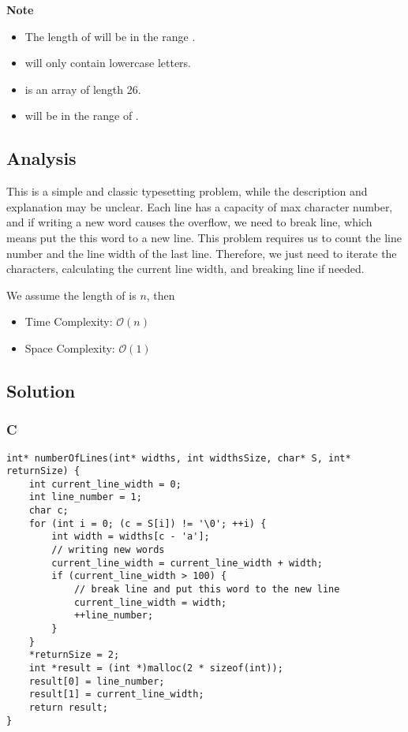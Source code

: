 \textbf{Note}
\begin{itemize}
    \item The length of  will be in the range \inlinecode{[1, 1000]}.
    \item {} will only contain lowercase letters.
    \item {} is an array of length 26.
    \item {} will be in the range of \inlinecode{[2, 10]}.
\end{itemize}

\subsection*{Analysis}
This is a simple and classic typesetting problem, while the description and explanation may be unclear. Each line has a capacity of max character number, and if writing a new word causes the overflow, we need to break line, which means put the this word to a new line. This problem requires us to count the line number and the line width of the last line. Therefore, we just need to iterate the characters, calculating the current line width, and breaking line if needed.

We assume the length of  is $n$, then
\begin{itemize}
\item Time Complexity: $\mathcal{O}(n)$
\item Space Complexity: $\mathcal{O}(1)$
\end{itemize}

\subsection*{Solution}
\subsubsection*{C}
\begin{verbatim}
int* numberOfLines(int* widths, int widthsSize, char* S, int* returnSize) {
    int current_line_width = 0;
    int line_number = 1;
    char c;
    for (int i = 0; (c = S[i]) != '\0'; ++i) {
        int width = widths[c - 'a'];
        // writing new words
        current_line_width = current_line_width + width;
        if (current_line_width > 100) {
            // break line and put this word to the new line
            current_line_width = width;
            ++line_number;
        }
    }
    *returnSize = 2;
    int *result = (int *)malloc(2 * sizeof(int));
    result[0] = line_number;
    result[1] = current_line_width;
    return result;
}
\end{verbatim}

\newpage

